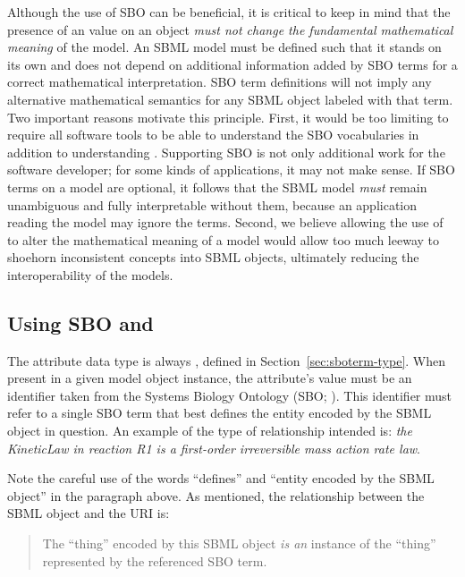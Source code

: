 Although the use of SBO can be beneficial, it is critical to keep
in mind that the presence of an  value on an object
\emph{must not change the fundamental mathematical meaning} of the
model.  An SBML model must be defined such that it stands on its
own and does not depend on additional information added by SBO
terms for a correct mathematical interpretation.  SBO term
definitions will not imply any alternative mathematical semantics
for any SBML object labeled with that term.  Two important
reasons motivate this principle.  First, it would be too limiting
to require all software tools to be able to understand the SBO
vocabularies in addition to understanding .
Supporting SBO is not only additional work for the software
developer; for some kinds of applications, it may not make sense.
If SBO terms on a model are optional, it follows that the SBML
model \emph{must} remain unambiguous and fully interpretable
without them, because an application reading the model may ignore
the terms.  Second, we believe allowing the use of 
to alter the mathematical meaning of a model would allow
  too much leeway to shoehorn inconsistent concepts into SBML
objects, ultimately reducing the interoperability of the
models.

\subsection{Using SBO and }

The  attribute data type is always
, defined in Section~\ref{sec:sboterm-type}.
When present in a given model object instance, the
attribute's value must be an identifier taken from the
Systems Biology Ontology (SBO; \sboref).  This identifier must
refer to a single SBO term that best defines the entity encoded by
the SBML object in question.  An example of the type of
relationship intended is: \emph{the KineticLaw in reaction R1 is a
  first-order irreversible mass action rate law}.

Note the careful use of the words ``defines'' and ``entity encoded
by the SBML object'' in the paragraph above.  As mentioned, the
relationship between the SBML object and the URI is:

\begin{quote}
  The ``thing'' encoded by this SBML object \emph{is an} instance
  of the ``thing'' represented by the referenced SBO term.
\end{quote}

